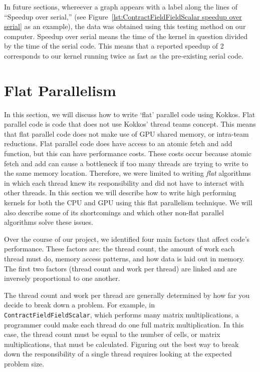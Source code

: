 In future sections, whereever a graph appears with a label along the lines of ``Speedup over serial,'' (see Figure~\ref{lst:ContractFieldFieldScalar speedup over serial} as an example),
the data was obtained using this testing method on our computer. Speedup over serial means the time of the kernel in question divided by the time of the serial code. This means 
that a reported speedup of 2 corresponds to our kernel running twice as fast as the pre-existing serial code.


\section{Flat Parallelism}
In this section, we will discuss how to write `flat' parallel code using Kokkos. 
Flat parallel code is code that does not use Kokkos' thread teams concept. This means
that flat parallel code does not make use of GPU shared memory, or intra-team reductions.
Flat parallel code does have access to an atomic fetch and add function, 
but this can have performance costs. These costs occur because atomic fetch and add can 
cause a bottleneck if too many threads
are trying to write to the same memory location. Therefore, we were limited to
writing \emph{flat} algorithms in which each thread knew its responsibility and did not
have to interact with other threads. In this section we will describe how to write
high performing kernels for both the CPU and GPU using this flat parallelism
technique. We will also describe some of its shortcomings and which other
non-flat parallel algorithms solve these issues.

Over the course of our project, we identified four main factors that affect
code's performance. These factors are: the thread count, the amount of work
each thread must do, memory access patterns, and how data is laid out in memory.
The first two factors (thread count and work per thread) are linked and are 
inversely proportional to one another. 

The thread count and work per thread are generally determined by how far you
decide to break down a problem. For example, in \\ \texttt{ContractFieldFieldScalar}, which performs
many matrix multiplications, a programmer could make each thread do one full matrix
multiplication. In this case, the thread count must be equal to the number of cells,
or matrix multiplications, that must be calculated. Figuring out the best way
to break down the responsibility of a single thread requires looking at the
expected problem size. 

